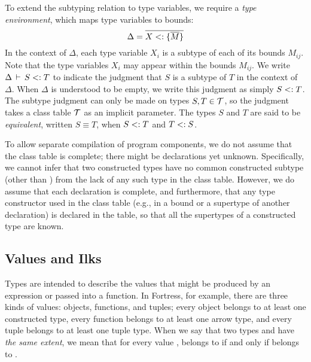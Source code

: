 To extend the subtyping relation to type variables,
we require  a \emph{type environment}, 
which maps type variables to bounds:
\[
\Delta = \overline{{X} <: \{\overline{M}\}}
\]
In the context of $\Delta$, 
each type variable $X_i$ is a subtype of each of its bounds $M_{ij}$.
Note that the type variables $X_i$ may appear within the bounds $M_{ij}$.
We write ${\Delta}\,\vdash\,{S}\;{<:}\;{T}$ 
to indicate the judgment that $S$ is a subtype of $T$ 
in the context of $\Delta$. When $\Delta$ is understood to be empty, 
we write this judgment as simply $S <: T$. The subtype judgment
can only be made on types $S, T \in \mathcal{T}$, so the judgment takes a class table $\mathcal{T}$ as an implicit parameter.
The types $S$ and $T$ are said to be \emph{equivalent}, written $S \equiv T$, when $S <: T$ and $T <: S$.

To allow separate compilation of program components, 
we do not assume that the class table is complete;
there might be declarations yet unknown.
Specifically, 
we cannot infer that two constructed types 
have no common constructed subtype (other than \BottomType) 
from the lack of any such type in the class table.
However, we do assume that each declaration is complete, 
and furthermore, 
that any type constructor used in the class table 
(e.g., in a bound or a supertype of another declaration)
is declared in the table, 
so that all the supertypes of a constructed type 
are known.


\subsection{Values and Ilks}

Types are intended to describe the values that might be produced by
an expression or passed into a function.
In Fortress, for example, there are three kinds of values: 
objects, functions, and tuples;
every object belongs to at least one constructed type,
every function belongs to at least one arrow type,
and every tuple belongs to at least one tuple type.
When we say that two types  and  have \emph{the same extent},
we mean that for every value , 
 belongs to  if and only if  belongs to .

